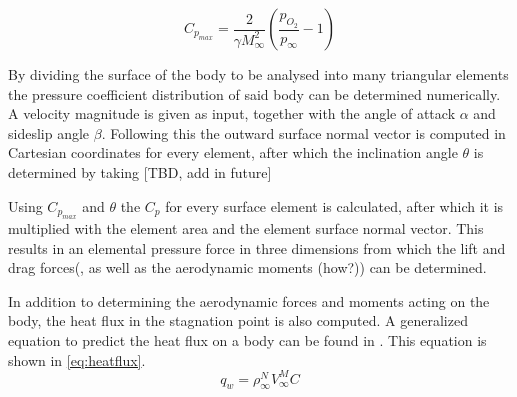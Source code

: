 \begin{equation}
C_{p_{max}}=\frac{2}{\gamma M_{\infty}^{2}}\left(\frac{p_{O_{2}}}{p_{\infty}}-1\right)
\label{eq:cpmaxfinal}
\end{equation}

By dividing the surface of the body to be analysed into many triangular elements the pressure coefficient distribution of said body can be determined numerically. A velocity magnitude is given as input, together with the angle of attack $\alpha$ and sideslip angle $\beta$. Following this the outward surface normal vector is computed in Cartesian coordinates for every element, after which the inclination angle $\theta$ is determined by taking [TBD, add in future] 

Using $C_{p_{max}}$ and $\theta$ the $C_{p}$ for every surface element is calculated, after which it is multiplied with the element area and the element surface normal vector. This results in an elemental pressure force in three dimensions from which the lift and drag forces(, as well as the aerodynamic moments (how?)) can be determined. 

In addition to determining the aerodynamic forces and moments acting on the body, the heat flux in the stagnation point is also computed. A generalized equation to predict the heat flux on a body can be found in \cite{AndersonJr.2006,Tauber1986}. This equation is shown in \ref{eq:heatflux}.
\begin{equation}
q_{w}=\rho_{\infty}^{N}V_{\infty}^{M}C
\label{eq:heatflux}
\end{equation}


